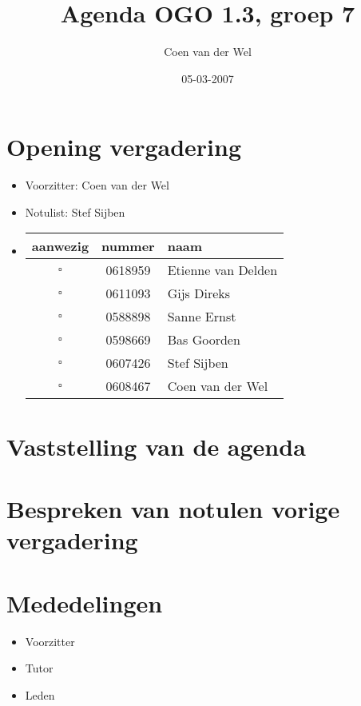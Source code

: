 \documentclass[]{article}
\title{Agenda OGO 1.3, groep 7 }
\author{Coen van der Wel}
\date{05-03-2007}
\begin{document}
    \maketitle

    \section{Opening vergadering}
    \begin{itemize}
        \item Voorzitter: Coen van der Wel
        \item Notulist: Stef Sijben
        \item   \begin{tabular}{c | c | l}
                    aanwezig & nummer & naam \\
                    \hline
                    $\square$ & 0618959 & Etienne van Delden \\
                    $\square$ & 0611093 & Gijs Direks \\
                    $\square$ & 0588898 & Sanne Ernst \\
                    $\square$ & 0598669 & Bas Goorden \\
                    $\square$ & 0607426 & Stef Sijben\\
                    $\square$ & 0608467 & Coen van der Wel \\
                \end{tabular}
    \end{itemize}

    \section{Vaststelling van de agenda}

    \section{Bespreken van notulen vorige vergadering}

    \section{Mededelingen}
    \begin{itemize}
        \item Voorzitter
        \item Tutor
        \item Leden
    \end{itemize}
\end{document}
